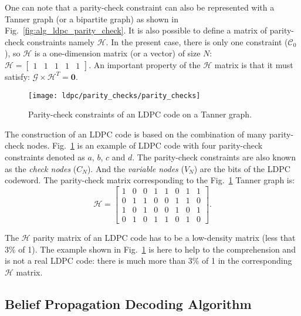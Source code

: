 One can note that a parity-check constraint can also be represented with a
Tanner graph (or a bipartite graph) as shown in
Fig.~\ref{fig:alg_ldpc_parity_check}. It is also possible to define a matrix of
parity-check constraints namely $\bm{\mathcal{H}}$. In the present case, there
is only one constraint ($\mathcal{C}_0$), so $\bm{\mathcal{H}}$ is a
one-dimension matrix (or a vector) of size $N$:
$
\bm{\mathcal{H}} =
\begin{bmatrix}
1 & 1 & 1 & 1 & 1
\end{bmatrix}.
$
An important property of the $\bm{\mathcal{H}}$ matrix is that it must satisfy:
$\bm{\mathcal{G}} \times \bm{\mathcal{H}}^T = \bm{0}.$

\begin{figure}[htp]
  \centering
  \texttt{[image: ldpc/parity\_checks/parity\_checks]}
  \caption{Parity-check constraints of an LDPC code on a Tanner graph.}
  \label{fig:ctx_ldpc_parity_checks}
\end{figure}

The construction of an LDPC code is based on the combination of many
parity-check nodes. Fig.~\ref{fig:ctx_ldpc_parity_checks} is an example of LDPC
code with four parity-check constraints denoted as $a$, $b$, $c$ and $d$. The
parity-check constraints are also known as the \emph{check nodes} ($C_N$).
And the \emph{variable nodes} ($V_N$) are the bits of the LDPC codeword. The
parity-check matrix corresponding to the Fig.~\ref{fig:ctx_ldpc_parity_checks}
Tanner graph is:
\begin{equation*}
\bm{\mathcal{H}} =
\begin{bmatrix}
  1 & 0 & 0 & 1 & 1 & 0 & 1 & 1\\
  0 & 1 & 1 & 0 & 0 & 1 & 1 & 0\\
  1 & 0 & 1 & 0 & 0 & 1 & 0 & 1\\
  0 & 1 & 0 & 1 & 1 & 0 & 1 & 0
\end{bmatrix}.
\end{equation*}

The $\bm{\mathcal{H}}$ parity matrix of an LDPC code has to be a low-density
matrix (less that 3\% of 1). The example shown in
Fig.~\ref{fig:ctx_ldpc_parity_checks} is here to help to the comprehension and
is not a real LDPC code: there is much more than 3\% of 1 in the corresponding
$\bm{\mathcal{H}}$ matrix.

\subsection{Belief Propagation Decoding Algorithm}


